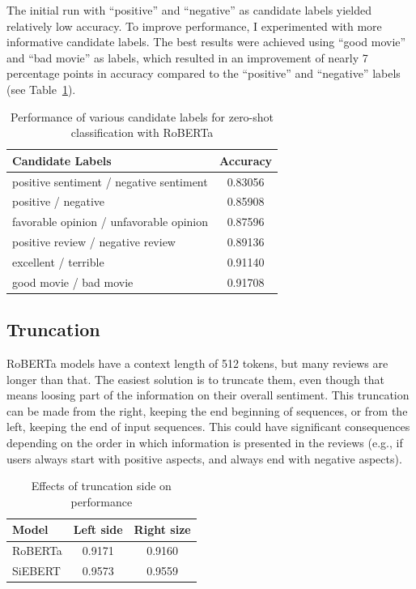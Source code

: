 \documentclass{article}
\begin{document}
The initial run with \enquote{positive} and \enquote{negative} as candidate labels yielded relatively low accuracy. To improve performance, I experimented with more informative candidate labels. The best results were achieved using \enquote{good movie} and \enquote{bad movie} as labels, which resulted in an improvement of nearly 7 percentage points in accuracy compared to the \enquote{positive} and \enquote{negative} labels (see Table~\ref{tab:labels_zero_shot}).

\begin{table}
  \caption{Performance of various candidate labels for zero-shot classification with RoBERTa}
  \label{tab:labels_zero_shot}
  \centering
  \begin{tabular}{lc}
    \toprule
    \textbf{Candidate Labels} & \textbf{Accuracy} \\
    \midrule
    positive sentiment / negative sentiment & 0.83056 \\
    positive / negative & 0.85908 \\
    favorable opinion / unfavorable opinion & 0.87596 \\
    positive review / negative review & 0.89136 \\
    excellent / terrible & 0.91140 \\
    good movie / bad movie & 0.91708 \\
    \bottomrule
  \end{tabular}
\end{table}

\subsection{Truncation}

RoBERTa models have a context length of 512 tokens, but many reviews are longer than that. The easiest solution is to truncate them, even though that means loosing part of the information on their overall sentiment. This truncation can be made from the right, keeping the end beginning of sequences, or from the left, keeping the end of input sequences. This could have significant consequences depending on the order in which information is presented in the reviews (e.g., if users always start with positive aspects, and always end with negative aspects).

\begin{table}
  \caption{Effects of truncation side on performance}
  \label{tab:truncation}
  \centering
  \begin{tabular}{lcc}
    \toprule
    \textbf{Model} & \textbf{Left side} & \textbf{Right size} \\
    \midrule
    RoBERTa & 0.9171 & 0.9160 \\
    SiEBERT & 0.9573 & 0.9559 \\
    \bottomrule
  \end{tabular}
\end{table}
\end{document}
